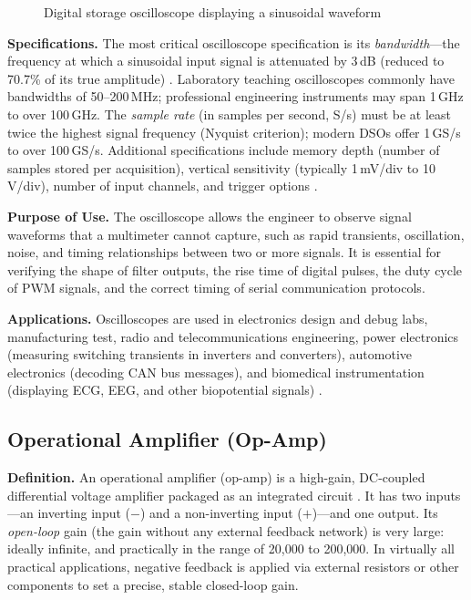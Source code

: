 \documentclass[12pt, a4paper, twoside]{report}
\newcommand{\imgplaceholder}[2]{%
  \begin{figure}[H]
    \centering
    \fcolorbox{gray!60}{gray!12}{%
      \parbox[c][5cm][c]{0.65\textwidth}{%
        \centering
        \textcolor{gray!80}{\Large [Image Placeholder]}\\[6pt]
        \textcolor{gray}{\small Insert figure here}
      }%
    }
    \caption{#1}
    \label{fig:#2}
  \end{figure}
}
\begin{document}
\imgplaceholder{Digital storage oscilloscope displaying a sinusoidal waveform}{oscilloscope}

\textbf{Specifications.}\quad
The most critical oscilloscope specification is its \textit{bandwidth}---the frequency
at which a sinusoidal input signal is attenuated by 3\,dB (reduced to 70.7\% of its true
amplitude) \cite{tek:oscilloscope}. Laboratory teaching oscilloscopes commonly have
bandwidths of 50--200\,MHz; professional engineering instruments may span 1\,GHz to
over 100\,GHz. The \textit{sample rate} (in samples per second, S/s) must be at least
twice the highest signal frequency (Nyquist criterion); modern DSOs offer 1\,GS/s to
over 100\,GS/s. Additional specifications include memory depth (number of samples stored
per acquisition), vertical sensitivity (typically 1\,mV/div to 10\,V/div), number of
input channels, and trigger options \cite{keysight:bandwidth}.

\textbf{Purpose of Use.}\quad
The oscilloscope allows the engineer to observe signal waveforms that a multimeter cannot
capture, such as rapid transients, oscillation, noise, and timing relationships between
two or more signals. It is essential for verifying the shape of filter outputs, the rise
time of digital pulses, the duty cycle of PWM signals, and the correct timing of serial
communication protocols.

\textbf{Applications.}\quad
Oscilloscopes are used in electronics design and debug labs, manufacturing test, radio
and telecommunications engineering, power electronics (measuring switching transients in
inverters and converters), automotive electronics (decoding CAN bus messages), and
biomedical instrumentation (displaying ECG, EEG, and other biopotential signals)
\cite{wiki:oscilloscope}.

\subsection{Operational Amplifier (Op-Amp)}

\textbf{Definition.}\quad
An operational amplifier (op-amp) is a high-gain, DC-coupled differential voltage
amplifier packaged as an integrated circuit \cite{wiki:opamp}. It has two inputs---an
inverting input ($-$) and a non-inverting input ($+$)---and one output. Its \textit{open-loop}
gain (the gain without any external feedback network) is very large: ideally infinite, and
practically in the range of 20{,}000 to 200{,}000. In virtually all practical applications,
negative feedback is applied via external resistors or other components to set a precise,
stable closed-loop gain.
\end{document}
